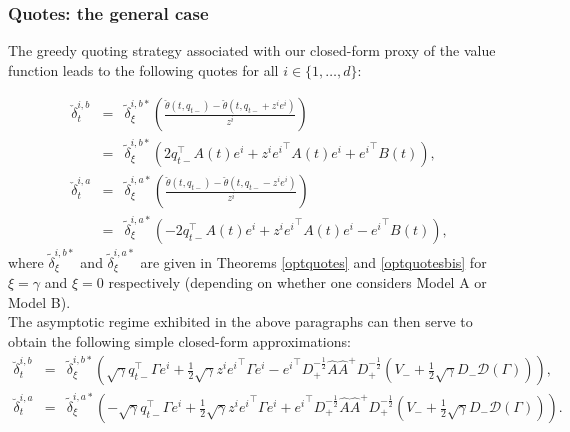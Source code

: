 \documentclass[preprint, 3p]{elsarticle}
\newcommand{\1}{{\chi}}
\begin{document}
\subsubsection{Quotes: the general case}
\label{subapproxgen}
\vspace{3mm}
The greedy quoting strategy associated with our closed-form proxy of the value function leads to the following quotes for all $i \in \{1, \ldots, d\}$:

\begin{eqnarray*}
	\check\delta^{i,b}_t &=& \tilde{\delta}^{i,b*}_\xi\left(\frac{\check\theta(t,q_{t-}) - \check\theta(t,q_{t-}+z^i e^i)}{z^i}\right)\\
 &=& \tilde{\delta}^{i,b*}_\xi\left(2q_{t-}^\intercal A(t) e^i + z^i {e^i}^\intercal A(t) e^i + {e^i}^\intercal B(t) \right),\\
	\check\delta^{i,a}_t &=& \tilde{\delta}^{i,a*}_\xi\left(\frac{\check\theta(t,q_{t-}) - \check\theta(t,q_{t-}-z^i e^i)}{z^i}\right)\\
&=& \tilde{\delta}^{i,a*}_\xi\left(-2q_{t-}^\intercal A(t) e^i + z^i {e^i}^\intercal A(t) e^i - {e^i}^\intercal B(t) \right),
	\end{eqnarray*}
where $\tilde{\delta}^{i,b*}_\xi$ and $\tilde{\delta}^{i,a*}_\xi$ are given in Theorems \ref{optquotes} and \ref{optquotesbis} for $\xi = \gamma$ and $\xi = 0$ respectively (depending on whether one considers Model A or Model B).\\

The asymptotic regime exhibited in the above paragraphs can then serve to obtain the following simple closed-form approximations:
\begin{eqnarray}
	\breve\delta^{i,b}_t &=& \tilde{\delta}^{i,b*}_\xi\left(\sqrt\gamma q_{t-}^\intercal \Gamma e^i + \frac 12 \sqrt\gamma z^i {e^i}^\intercal \Gamma e^i - {e^i}^\intercal D_+^{-\frac 12}\widehat{A}\widehat{A}^+ D_+^{-\frac 12} \left(V_-
     + \frac{1}{2}\sqrt{\gamma} D_- \mathcal D(\Gamma) \right)\right),\label{asymptb}\\
	\breve\delta^{i,a}_t &=& \tilde{\delta}^{i,a*}_\xi\left(-\sqrt\gamma q_{t-}^\intercal \Gamma e^i + \frac 12 \sqrt\gamma z^i {e^i}^\intercal \Gamma e^i + {e^i}^\intercal D_+^{-\frac 12}\widehat{A}\widehat{A}^+ D_+^{-\frac 12} \left(V_-
     + \frac{1}{2}\sqrt{\gamma} D_- \mathcal D(\Gamma) \right)\right).\label{asympta}
	\end{eqnarray}
\end{document}
